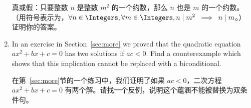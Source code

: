 \begin{enumerate}
    真或假：只要整数 $n$ 是整数 $m^2$ 的一个约数，那么 $n$ 也是 $m$ 的一个约数。（用符号表示为，$\forall n \in \Integers, \forall m \in \Integers, n \mid m^2 \; \implies \; n \mid m$。）证明你的答案。
    
    \wbvfill
    
    
    
    \item In an exercise in Section~\ref{sec:more} we proved that the quadratic 
    equation $ax^2 + bx + c = 0$ has two solutions if $ac < 0$.
    Find a counterexample which shows that this implication cannot be replaced with a biconditional.
    
    在第~\ref{sec:more}节的一个练习中，我们证明了如果 $ac < 0$，二次方程 $ax^2 + bx + c = 0$ 有两个解。请找一个反例，说明这个蕴涵不能被替换为双条件句。
    
    \wbvfill
    
    \end{enumerate}